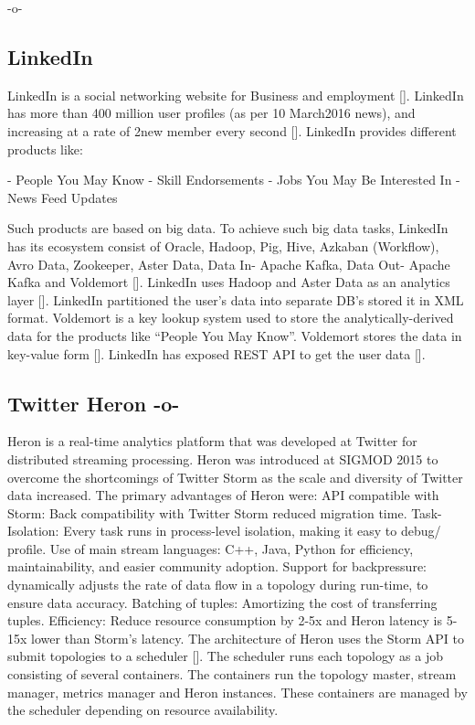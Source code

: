      -o-

\subsection{LinkedIn}
     
LinkedIn is a social networking website for Business and
employment [\cite{www-linkedinwiki}]. LinkedIn has more than 400 million
user profiles (as per 10 March2016 news), and increasing at a rate of
2new member every second [\cite{www-linkedinbigdata}].  LinkedIn
provides different products like:

- People You May Know
- Skill Endorsements
- Jobs You May Be Interested In
- News Feed Updates

Such products are based on big data. To achieve such big data tasks,
LinkedIn has its ecosystem consist of Oracle, Hadoop, Pig, Hive,
Azkaban (Workflow), Avro Data, Zookeeper, Aster Data, Data In- Apache
Kafka, Data Out- Apache Kafka and Voldemort
[\cite{www-linkedinbigdata}]. LinkedIn uses Hadoop and Aster Data as
an analytics layer [\cite{www-linkedinquora}]. LinkedIn partitioned
the user's data into separate DB's stored it in XML format. Voldemort
is a key lookup system used to store the analytically-derived data for
the products like ``People You May Know''. Voldemort stores the data
in key-value form [\cite{www-linkedinquora}]. LinkedIn has exposed
REST API to get the user data [\cite{www-linkedindevelopers}].

\subsection{Twitter Heron -o-}

Heron is a real-time analytics platform that was developed at Twitter
for distributed streaming processing. Heron was introduced at SIGMOD
2015 to overcome the shortcomings of Twitter Storm as the scale and
diversity of Twitter data increased.  The primary advantages of Heron
were: API compatible with Storm: Back compatibility with Twitter Storm
reduced migration time\cite{www-TwitterHeronOpen}.  Task-Isolation:
Every task runs in process-level isolation, making it easy to debug/
profile. Use of main stream languages: C++, Java, Python for
efficiency, maintainability, and easier community adoption. Support
for backpressure: dynamically adjusts the rate of data flow in a
topology during run-time, to ensure data accuracy. Batching of tuples:
Amortizing the cost of transferring tuples. Efficiency: Reduce
resource consumption by 2-5x and Heron latency is 5-15x lower than
Storm's latency. The architecture of Heron uses the Storm API to
submit topologies to a scheduler [\cite{www-TwitterHeron}].  The
scheduler runs each topology as a job consisting of several
containers. The containers run the topology master, stream manager,
metrics manager and Heron instances. These containers are managed by
the scheduler depending on resource availability.

